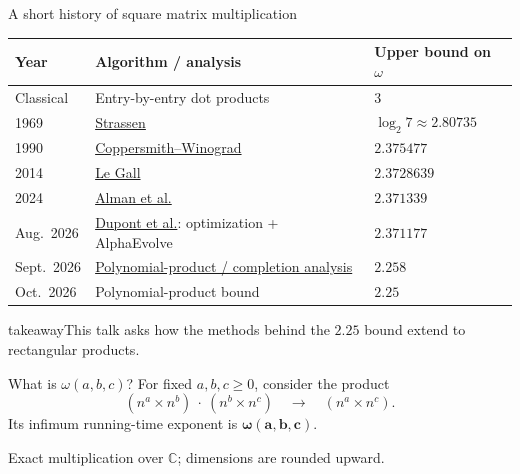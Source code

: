 \documentclass[aspectratio=169,11pt]{beamer}
\newcommand{\CC}{\mathbb C}
\newcommand{\source}[1]{\vfill\par{\fontsize{7.5}{9}\selectfont\color{muted}#1\par}}
\newcommand{\takeaway}[1]{\begin{beamercolorbox}[sep=0.65em,wd=\linewidth]{takeaway}#1\end{beamercolorbox}}
\begin{document}
\begin{frame}{A short history of square matrix multiplication}
  \begin{center}
  \small
  \renewcommand{\arraystretch}{1.22}
  \begin{tabular}{@{}lll@{}}
    \toprule
    Year & Algorithm / analysis & Upper bound on $\omega$\\
    \midrule
    Classical & Entry-by-entry dot products & $3$\\
    1969 & \href{https://doi.org/10.1007/BF02165411}{Strassen} & $\log_2 7\approx2.80735$\\
    1990 & \href{https://doi.org/10.1016/0747-7171(90)90013-2}{Coppersmith--Winograd} & $2.375477$\\
    2014 & \href{https://arxiv.org/abs/1401.7714}{Le Gall} & $2.3728639$\\
    2024 & \href{https://arxiv.org/abs/2404.16349}{Alman et al.} & $2.371339$\\
    Aug.\ 2026 & \href{https://arxiv.org/abs/2608.16884}{Dupont et al.}: optimization + AlphaEvolve & $2.371177$\\
    Sept.\ 2026 & \href{https://github.com/openai/math/tree/main/preprints/Complex-Matrix-Multiplication-Below-2.258-and-Rectangular-Bounds-September-24-2026}{Polynomial-product / completion analysis} & $2.258$\\
    Oct.\ 2026 & Polynomial-product bound~\cite{nine-fourths} & $2.25$\\
    \bottomrule
  \end{tabular}
  \end{center}
  \medskip
  \takeaway{This talk asks how the methods behind the $2.25$ bound
    extend to rectangular products.}
\end{frame}

\begin{frame}{What is $\omega(a,b,c)$?}
  For fixed $a,b,c\ge0$, consider the product
  \[
    (n^a\times n^b)\ \cdot\ (n^b\times n^c)
    \quad\longrightarrow\quad(n^a\times n^c).
  \]
  Its infimum running-time exponent is $\boldsymbol{\omega(a,b,c)}$.
  \medskip
  \begin{center}
  \end{center}
  \source{Exact multiplication over $\CC$; dimensions are rounded upward.}
\end{frame}
\end{document}

